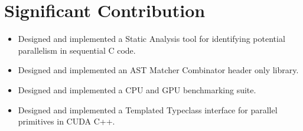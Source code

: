 
\section{Significant Contribution}

\begin{itemize}
\item Designed and implemented a Static Analysis tool for identifying potential parallelism in sequential C code.
\item Designed and implemented an AST Matcher Combinator header only library.
\item Designed and implemented a CPU and GPU benchmarking suite.
\item Designed and implemented a Templated Typeclass interface for parallel primitives in CUDA C++.
\end{itemize}
